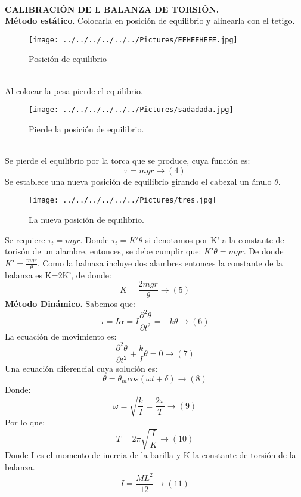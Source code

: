 \documentclass[11pt,a4paper]{article}
\begin{document}
 \\
\textbf{CALIBRACI\'{O}N DE L BALANZA DE TORSI\'{O}N.}
\\
\textbf{M\'{e}todo est\'{a}tico}. Colocarla en posici\'{o}n de equilibrio y alinearla con el tetigo. 
\begin{figure}[hbtp]
\caption{Posici\'{o}n de equilibrio }
\centering
\texttt{[image: ../../../../../../Pictures/EEHEEHEFE.jpg]}
\end{figure}
\\
Al colocar la pesa pierde el equilibrio.
\begin{figure}[hbtp]
\centering
\texttt{[image: ../../../../../../Pictures/sadadada.jpg]}
\caption{Pierde la posici\'{o}n de equilibrio.}  
\end{figure}
\\
Se pierde el equilibrio por la torca que se produce, cuya funci\'{o}n es:
\[\tau=mgr \longrightarrow (4)\]
Se establece una nueva posici\'{o}n de equilibrio girando el cabezal un \'{a}nulo $\theta$.

\begin{figure}[hbtp]
\centering
\texttt{[image: ../../../../../../Pictures/tres.jpg]}
\caption{La nueva posici\'{o}n de equilibrio. }
\end{figure}
Se requiere $\tau_{t}=mgr$. Donde $\tau_{t}=K'\theta$ si denotamos por K' a la constante de toris\'{o}n de un alambre, entonces, se debe cumplir que: $K'\theta=mgr$. De donde $K'= \frac{mgr}{\theta}$. Como la balnaza incluye dos alambres entonces la constante de la balanza es K=2K', de donde: 
\[ K = \frac{2mgr}{\theta} \longrightarrow (5)\]
\textbf{M\'{e}todo Din\'{a}mico.} Sabemos que:
\[ \tau =I\alpha =I\frac { { \partial  }^{ 2 }\theta  }{ { \partial { t }^{ 2 } } } =-k\theta \longrightarrow (6)\]
La ecuaci\'{o}n de movimiento es:
\[\frac { { \partial  }^{ 2 }\theta  }{ { \partial { t }^{ 2 } } } +\frac { k }{ I } \theta =0 \longrightarrow (7) \]
Una ecuaci\'{o}n diferencial cuya soluci\'{o}n es: 
\[\theta ={ \theta  }_{ m }cos(\omega t+\delta ) \longrightarrow (8)\]
Donde: 
\[\omega =\sqrt { \frac { k }{ I }  } =\frac { 2\pi  }{ T } \longrightarrow (9) \]
Por lo que:
\[T=2\pi \sqrt { \frac { I }{ K }  } \longrightarrow (10)\]
Donde I es el momento de inercia de la barilla y K la constante de torsi\'{o}n de la balanza. 
\[I=\frac { M{ L }^{ 2 } }{ 12 } \longrightarrow (11) \]
\pagebreak

\end{document}
